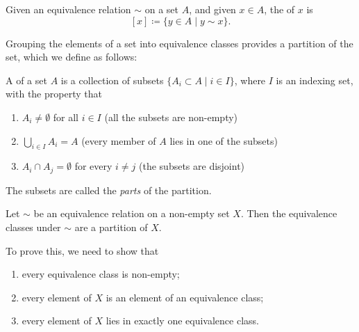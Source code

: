 \begin{definition}
Given an equivalence relation $\sim$ on a set $A$, and given $x \in A$, the  of $x$ is
\[[x]\coloneqq\{y\in A\mid y\sim x\}.\]
\end{definition}

Grouping the elements of a set into equivalence classes provides a partition of the set, which we define as follows:

\begin{definition}[Partition]
A  of a set $A$ is a collection of subsets $\{A_i\subset A\mid i\in I\}$, where $I$ is an indexing set, with the property that
\begin{enumerate}[label=(\roman*)]
\item $A_i\neq\emptyset$ for all $i\in I$ (all the subsets are non-empty)
\item $\bigcup_{i\in I}A_i=A$ (every member of $A$ lies in one of the subsets)
\item $A_i\cap A_j=\emptyset$ for every $i\neq j$ (the subsets are disjoint)
\end{enumerate}
The subsets are called the \emph{parts} of the partition.
\end{definition}

\begin{proposition}
Let $\sim$ be an equivalence relation on a non-empty set $X$. Then the equivalence classes under $\sim$ are a partition of $X$.
\end{proposition}

To prove this, we need to show that
\begin{enumerate}[label=(\roman*)]
\item every equivalence class is non-empty;
\item every element of $X$ is an element of an equivalence class;
\item every element of $X$ lies in exactly one equivalence class.
\end{enumerate}

